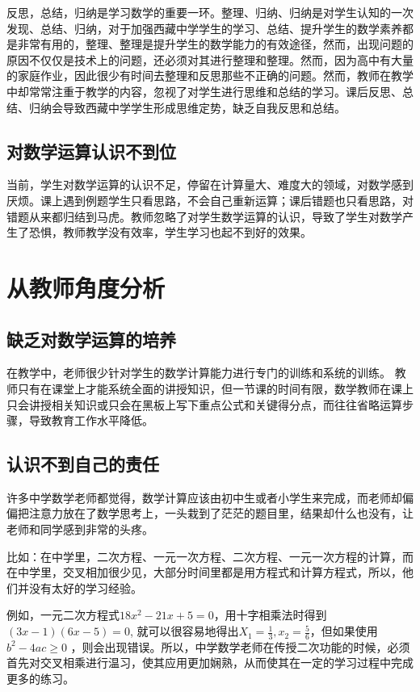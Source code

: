 反思，总结，归纳是学习数学的重要一环。整理、归纳、归纳是对学生认知的一次发现、总结、归纳，对于加强西藏中学学生的学习、总结、提升学生的数学素养都是非常有用的，整理、整理是提升学生的数学能力的有效途径，然而，出现问题的原因不仅仅是技术上的问题，还必须对其进行整理和整理。然而，因为高中有大量的家庭作业，因此很少有时间去整理和反思那些不正确的问题。然而，教师在教学中却常常注重于教学的内容，忽视了对学生进行思维和总结的学习。课后反思、总结、归纳会导致西藏中学学生形成思维定势，缺乏自我反思和总结。


\subsection{对数学运算认识不到位}

当前，学生对数学运算的认识不足，停留在计算量大、难度大的领域，对数学感到厌烦。课上遇到例题学生只看思路，不会自己重新运算；课后错题也只看思路，对错题从来都归结到马虎。教师忽略了对学生数学运算的认识，导致了学生对数学产生了恐惧，教师教学没有效率，学生学习也起不到好的效果。



\section{从教师角度分析}

\subsection{缺乏对数学运算的培养}

在教学中，老师很少针对学生的数学计算能力进行专门的训练和系统的训练。
教师只有在课堂上才能系统全面的讲授知识，但一节课的时间有限，数学教师在课上只会讲授相关知识或只会在黑板上写下重点公式和关键得分点，而往往省略运算步骤，导致教育工作水平降低。


\subsection{认识不到自己的责任}

许多中学数学老师都觉得，数学计算应该由初中生或者小学生来完成，而老师却偏偏把注意力放在了数学思考上，一头栽到了茫茫的题目里，结果却什么也没有，让老师和同学感到非常的头疼。

比如：在中学里，二次方程、一元一次方程、二次方程、一元一次方程的计算，而在中学里，交叉相加很少见，大部分时间里都是用方程式和计算方程式，所以，他们并没有太好的学习经验\cite{李雅男西藏高中生数学运算能力的培养}。

例如，一元二次方程式$18 x^{2}-21 x+5=0$，用十字相乘法时得到 $(3 {x}-1)(6 {x}-5)=0$, 就可以很容易地得出$X_{1}=\frac{1}{3}, x_{2}=\frac{5}{6}$，但如果使用 $b^{2}-4 {ac} \geqslant 0$ ，则会出现错误。所以，中学数学老师在传授二次功能的时候，必须首先对交叉相乘进行温习，使其应用更加娴熟，从而使其在一定的学习过程中完成更多的练习。


